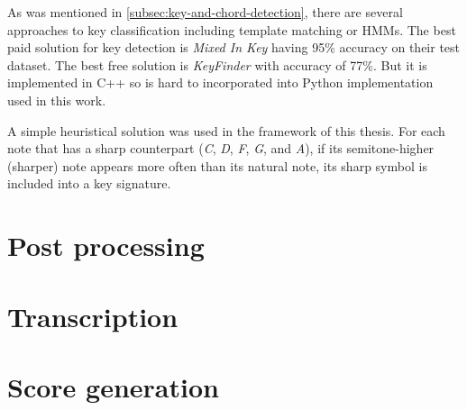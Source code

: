 As was mentioned in \cref{subsec:key-and-chord-detection}, there are several approaches to key classification including
template matching or \acp{HMM}. The best paid solution for key detection is \textit{Mixed In Key}\cite{mixed-in-keys}
having 95\% accuracy on their test dataset. The best free solution is \textit{KeyFinder}\cite{key-finder} with accuracy
of 77\%. But it is implemented in C++ so is hard to incorporated into Python implementation used in this work.

A simple heuristical solution was used in the framework of this thesis. For each note that has a sharp counterpart
(\textit{C}, \textit{D}, \textit{F}, \textit{G}, and \textit{A}), if its semitone-higher (sharper) note appears more
often than its natural note, its sharp symbol is included into a key signature.


\section{Post processing}\label{sec:post-processing}

\section{Transcription}\label{sec:transcription}

\section{Score generation}\label{sec:score-generation}




